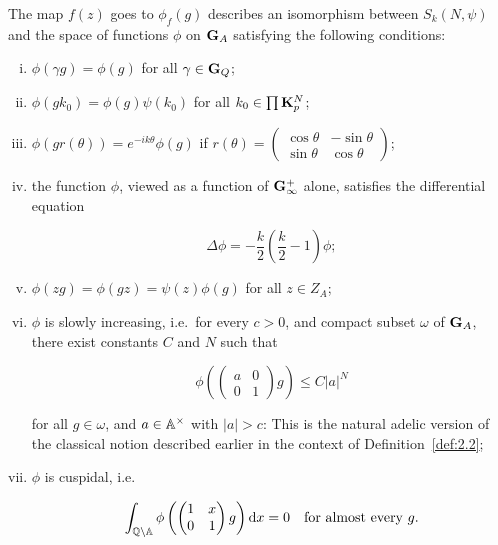 \begin{proposition}\label{prop:3.1}

The map $f(z)$ goes to $\phi_f(g)$ describes an isomorphism between $S_k(N,\psi)$ and the space of functions $\phi$ on $\mathbf{G}_A$ satisfying the following conditions:

\begin{enumerate}[(i)]

\item $\phi(\gamma g) = \phi(g)$ for all $\gamma \in \mathbf{G}_Q$;

\item $\phi(gk_0) = \phi(g)\psi(k_0)$ for all $k_0 \in \prod \mathbf{K}_p^N$;

\item $\phi(gr(\theta)) = e^{-ik\theta}\phi(g)$ if $r(\theta) = \begin{pmatrix} \cos\theta & -\sin\theta \\ \sin\theta & \cos\theta \end{pmatrix}$;

\item the function $\phi$, viewed as a function of $\mathbf{G}_\infty^+$ alone, satisfies the differential equation

\begin{equation}\label{eq:3.6}
\Delta\phi = -\frac{k}{2}\left(\frac{k}{2}-1\right)\phi;\tag{3.6}
\end{equation}

\item $\phi(zg) = \phi(gz) = \psi(z)\phi(g)$ for all $z \in Z_A$;

\item $\phi$ is slowly increasing, i.e.\ for every $c > 0$, and compact subset $\omega$ of $\mathbf{G}_A$, there exist constants $C$ and $N$ such that

\[
\phi\left(\begin{pmatrix} a & 0 \\ 0 & 1 \end{pmatrix}g\right) \leq C|a|^N
\]

for all $g \in \omega$, and $a \in \mathbb{A}^{\times}$ with $|a| > c$: This is the natural adelic version of the classical notion described earlier in the context of Definition~\ref{def:2.2};

\item $\phi$ is cuspidal, i.e.

\[
\int_{\mathbb{Q}\backslash\mathbb{A}}\phi\left(\begin{pmatrix} 1 & x \\ 0 & 1 \end{pmatrix}g\right)\mathrm{d} x = 0 \quad \text{for almost every } g.
\]

\end{enumerate}

\end{proposition}


